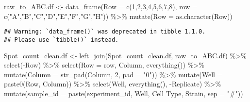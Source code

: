 \documentclass[
]{article}
\newenvironment{Shaded}{\begin{snugshade}}{\end{snugshade}}
\newcommand{\AttributeTok}[1]{\textcolor[rgb]{0.77,0.63,0.00}{#1}}
\newcommand{\DecValTok}[1]{\textcolor[rgb]{0.00,0.00,0.81}{#1}}
\newcommand{\FunctionTok}[1]{\textcolor[rgb]{0.00,0.00,0.00}{#1}}
\newcommand{\NormalTok}[1]{#1}
\newcommand{\OtherTok}[1]{\textcolor[rgb]{0.56,0.35,0.01}{#1}}
\newcommand{\SpecialCharTok}[1]{\textcolor[rgb]{0.00,0.00,0.00}{#1}}
\newcommand{\StringTok}[1]{\textcolor[rgb]{0.31,0.60,0.02}{#1}}
\begin{document}
\begin{Shaded}
\begin{Highlighting}[]
\NormalTok{raw\_to\_ABC.df }\OtherTok{\textless{}{-}} \FunctionTok{data\_frame}\NormalTok{(}\AttributeTok{Row =} \FunctionTok{c}\NormalTok{(}\DecValTok{1}\NormalTok{,}\DecValTok{2}\NormalTok{,}\DecValTok{3}\NormalTok{,}\DecValTok{4}\NormalTok{,}\DecValTok{5}\NormalTok{,}\DecValTok{6}\NormalTok{,}\DecValTok{7}\NormalTok{,}\DecValTok{8}\NormalTok{), }\AttributeTok{row =} \FunctionTok{c}\NormalTok{(}\StringTok{"A"}\NormalTok{,}\StringTok{"B"}\NormalTok{,}\StringTok{"C"}\NormalTok{,}\StringTok{"D"}\NormalTok{,}\StringTok{"E"}\NormalTok{,}\StringTok{"F"}\NormalTok{,}\StringTok{"G"}\NormalTok{,}\StringTok{"H"}\NormalTok{)) }\SpecialCharTok{\%\textgreater{}\%}
  \FunctionTok{mutate}\NormalTok{(}\AttributeTok{Row =} \FunctionTok{as.character}\NormalTok{(Row))}
\end{Highlighting}
\end{Shaded}

\begin{verbatim}
## Warning: `data_frame()` was deprecated in tibble 1.1.0.
## Please use `tibble()` instead.
\end{verbatim}

\begin{Shaded}
\begin{Highlighting}[]
\NormalTok{Spot\_count\_clean.df }\OtherTok{\textless{}{-}} \FunctionTok{left\_join}\NormalTok{(Spot\_count\_clean.df, raw\_to\_ABC.df) }\SpecialCharTok{\%\textgreater{}\%}
  \FunctionTok{select}\NormalTok{(}\SpecialCharTok{{-}}\NormalTok{Row) }\SpecialCharTok{\%\textgreater{}\%}
  \FunctionTok{select}\NormalTok{(}\AttributeTok{Row =}\NormalTok{ row, Column, }\FunctionTok{everything}\NormalTok{()) }\SpecialCharTok{\%\textgreater{}\%}
  \FunctionTok{mutate}\NormalTok{(}\AttributeTok{Column =} \FunctionTok{str\_pad}\NormalTok{(Column, }\DecValTok{2}\NormalTok{, }\AttributeTok{pad =} \StringTok{"0"}\NormalTok{)) }\SpecialCharTok{\%\textgreater{}\%}
  \FunctionTok{mutate}\NormalTok{(}\AttributeTok{Well =} \FunctionTok{paste0}\NormalTok{(Row, Column)) }\SpecialCharTok{\%\textgreater{}\%}
  \FunctionTok{select}\NormalTok{(Well, }\FunctionTok{everything}\NormalTok{(), }\SpecialCharTok{{-}}\NormalTok{Replicate) }\SpecialCharTok{\%\textgreater{}\%}
  \FunctionTok{mutate}\NormalTok{(}\AttributeTok{sample\_id =} \FunctionTok{paste}\NormalTok{(experiment\_id, Well, }\StringTok{\textasciigrave{}}\AttributeTok{Cell Type}\StringTok{\textasciigrave{}}\NormalTok{, Strain, }\AttributeTok{sep =} \StringTok{"\#"}\NormalTok{))}
\end{Highlighting}
\end{Shaded}
\end{document}
